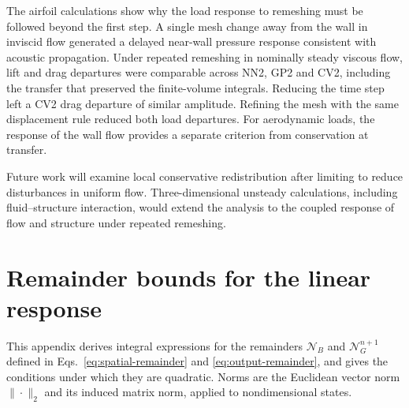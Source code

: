 \documentclass[a4paper,fleqn]{cas-sc}
\begin{document}
The airfoil calculations show why the load response to remeshing must be followed beyond the first step. A single mesh change away from the wall in inviscid flow generated a delayed near-wall pressure response consistent with acoustic propagation. Under repeated remeshing in nominally steady viscous flow, lift and drag departures were comparable across NN2, GP2 and CV2, including the transfer that preserved the finite-volume integrals. Reducing the time step left a CV2 drag departure of similar amplitude. Refining the mesh with the same displacement rule reduced both load departures. For aerodynamic loads, the response of the wall flow provides a separate criterion from conservation at transfer.

Future work will examine local conservative redistribution after limiting to reduce disturbances in uniform flow. Three-dimensional unsteady calculations, including fluid--structure interaction, would extend the analysis to the coupled response of flow and structure under repeated remeshing.

\FloatBarrier
\appendix
\section{Remainder bounds for the linear response}
\label{app:remainders}

This appendix derives integral expressions for the remainders $\mathcal N_B$ and $\mathcal N_G^{n+1}$ defined in Eqs.~\eqref{eq:spatial-remainder} and \eqref{eq:output-remainder}, and gives the conditions under which they are quadratic. Norms are the Euclidean vector norm $\|\cdot\|_2$ and its induced matrix norm, applied to nondimensional states.
\end{document}
